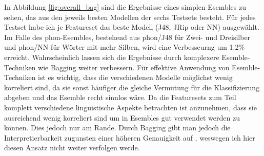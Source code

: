In Abbildung \ref{fig:overall_bag} sind die Ergebnisse eines simplen Esembles zu sehen, das aus den jeweils besten Modellen der sechs Testsets besteht. Für jedes Testset habe ich je Featureset das beste Modell (J48, JRip oder NN) ausgewählt. Im Falle des phon-Esembles, bestehend aus phon/J48 für Zwei- und Dreisilber und phon/NN für Wörter mit mehr Silben, wird eine Verbesseurng um 1.2\% erreicht. Wahrscheinlich lassen sich die Ergebnisse durch komplexere Esemble-Techniken wie Bagging \cite{Breiman1996} weiter verbessern. Für effektive Anwendung von Esemble-Techniken ist es wichtig, dass die verschiedenen Modelle möglichst wenig korreliert sind, da sie sonst häufiger die gleiche Vermutung für die Klassifizierung abgeben und das Esemble recht sinnlos wäre. Da die Featuresets zum Teil komplett verschiedene linguistische Aspekte betrachten ist anzunehmen, dass sie ausreichend wenig korreliert sind um in Esembles gut verwendet werden zu können. Dies jedoch nur am Rande. Durch Bagging gibt man jedoch die Interpretierbarkeit zugunsten einer höheren Genauigkeit auf \cite[S.\~137]{Breiman1996}, weswegen ich hier diesen Ansatz nicht weiter verfolgen werde.